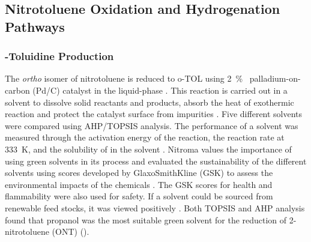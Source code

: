 

\subsection{Nitrotoluene Oxidation and Hydrogenation Pathways}
\subsubsection{\ortho-Toluidine Production}
The \textit{ortho} isomer of nitrotoluene is reduced to o-TOL using \SI{2}{\percent\ww} palladium-on-carbon (Pd/C) catalyst in the liquid-phase \cite{rajadhyaksha_solvent_1986}. This reaction is carried out in a solvent to dissolve solid reactants and products, absorb the heat of exothermic reaction and protect the catalyst surface from impurities \cite{yao_kinetics_1959}. Five different solvents were compared using AHP/TOPSIS analysis. The performance of a solvent was measured through the activation energy of the reaction, the reaction rate at \SI{333}{\K}, and the solubility of  in the solvent \cite{rajadhyaksha_solvent_1986}. Nitroma values the importance of using green solvents in its process and evaluated the sustainability of the different solvents using scores developed by GlaxoSmithKline (GSK) to assess the environmental impacts of the chemicals \cite{henderson_expanding_2011}. The GSK scores for health and flammability were also used for safety. If a solvent could be sourced from renewable feed stocks, it was viewed positively \cite{byrne_tools_2016}. Both TOPSIS and AHP analysis found that propanol was the most suitable green solvent for the reduction of 2-nitrotoluene (ONT) ().




